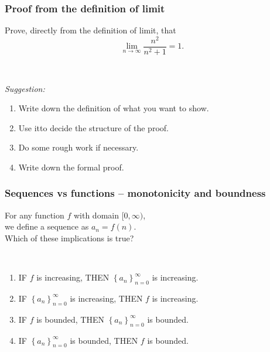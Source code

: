 \documentclass[14pt]{beamer}
\newcommand {\DS} [1] {${\displaystyle #1}$}
\newcommand{\an}{\left\{ a_n \right\}_{n=0}^{\infty}}
\begin{document}
\begin{frame}[t]
\frametitle{Proof from the definition of limit}

Prove, directly from the definition of limit, that
	$$
		\lim_{n \to \infty} \frac{n^2}{n^2+1} = 1.
	$$

\

\emph{Suggestion:}
\begin{enumerate}
	\item Write down the definition of what you want to show.
	\item  Use itto decide the structure of the proof.
	\item Do some rough work if necessary.
	\item  Write down the formal proof.
\end{enumerate}	
	
\end{frame}
\begin{frame}[t]
\frametitle{Sequences vs functions -- monotonicity and boundness}

For any function $f$ with domain $[0, \infty)$, \\
we define a sequence as $a_n = f(n)$. \\
Which of these implications is true?

\
\begin{enumerate}
	\item  IF $f$ is increasing,
		THEN \DS{\an} is increasing.	
		\vfill
	\item IF \DS{\an} is increasing,
		 THEN $f$ is increasing.
		\vfill
	\item  IF $f$ is bounded,
		THEN \DS{\an} is bounded.	
		\vfill
	\item IF \DS{\an} is bounded,
		 THEN $f$ is bounded.
		\vfill
\end{enumerate}

\end{frame}
\end{document}
